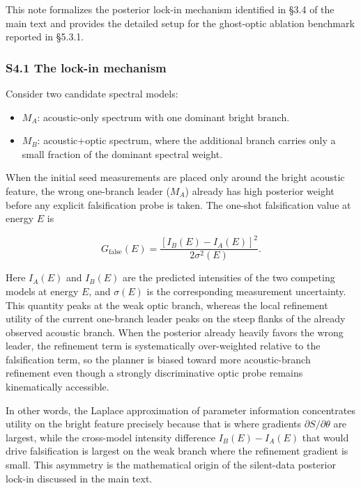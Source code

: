 \documentclass[
]{article}
\providecommand{\tightlist}{%
  \setlength{\itemsep}{0pt}\setlength{\parskip}{0pt}}
\begin{document}
This note formalizes the posterior lock-in mechanism identified in §3.4
of the main text and provides the detailed setup for the ghost-optic
ablation benchmark reported in §5.3.1.

\hypertarget{s4.1-the-lock-in-mechanism}{%
\subsubsection{S4.1 The lock-in
mechanism}\label{s4.1-the-lock-in-mechanism}}

Consider two candidate spectral models:

\begin{itemize}
\tightlist
\item
  \(M_A\): acoustic-only spectrum with one dominant bright branch.
\item
  \(M_B\): acoustic+optic spectrum, where the additional branch carries
  only a small fraction of the dominant spectral weight.
\end{itemize}

When the initial seed measurements are placed only around the bright
acoustic feature, the wrong one-branch leader (\(M_A\)) already has high
posterior weight before any explicit falsification probe is taken. The
one-shot falsification value at energy \(E\) is

\[
G_{\mathrm{false}}(E)=\frac{\left[I_B(E)-I_A(E)\right]^2}{2\sigma^2(E)}.
\]

Here \(I_A(E)\) and \(I_B(E)\) are the predicted intensities of the two
competing models at energy \(E\), and \(\sigma(E)\) is the corresponding
measurement uncertainty. This quantity peaks at the weak optic branch,
whereas the local refinement utility of the current one-branch leader
peaks on the steep flanks of the already observed acoustic branch. When
the posterior already heavily favors the wrong leader, the refinement
term is systematically over-weighted relative to the falsification term,
so the planner is biased toward more acoustic-branch refinement even
though a strongly discriminative optic probe remains kinematically
accessible.

In other words, the Laplace approximation of parameter information
concentrates utility on the bright feature precisely because that is
where gradients \(\partial S/\partial\theta\) are largest, while the
cross-model intensity difference \(I_B(E)-I_A(E)\) that would drive
falsification is largest on the weak branch where the refinement
gradient is small. This asymmetry is the mathematical origin of the
silent-data posterior lock-in discussed in the main text.
\end{document}
